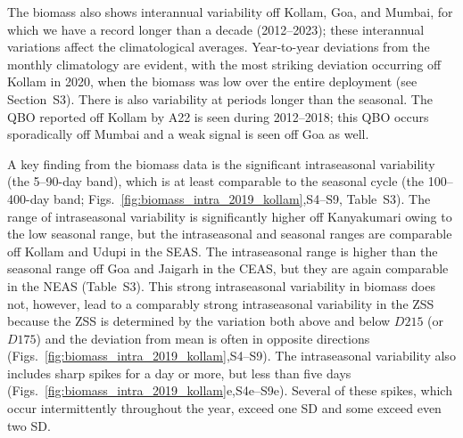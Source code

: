 \documentclass[authoryear,review,11pt]{elsarticle}
\begin{document}
The biomass also shows interannual variability off Kollam, Goa, and Mumbai, for which we have a record longer than a decade (2012--2023); these interannual variations affect the climatological averages. Year-to-year deviations from the monthly climatology are evident, with the most striking deviation occurring off Kollam in 2020, when the biomass was low over the entire deployment (see Section~S3). There is also variability at periods longer than the seasonal. The QBO reported off Kollam by A22 is seen during 2012--2018; this QBO occurs sporadically off Mumbai and a weak signal is seen off Goa as well. 

A key finding from the biomass data is the significant intraseasonal variability (the 5--90-day band), which is at least comparable to the seasonal cycle (the 100--400-day band; Figs.~\ref{fig:biomass_intra_2019_kollam},S4--S9, Table~S3). The range of intraseasonal variability is significantly higher off Kanyakumari owing to the low seasonal range, but the intraseasonal and seasonal ranges are comparable off Kollam and Udupi in the SEAS.  The intraseasonal range is higher than the seasonal range off Goa and Jaigarh in the CEAS, but they are again comparable in the NEAS (Table~S3). This strong intraseasonal variability in biomass does not, however, lead to a comparably strong intraseasonal variability in the ZSS because the ZSS is determined by the variation both above and below $D215$ (or $D175$) and the deviation from mean is often in opposite directions (Figs.~\ref{fig:biomass_intra_2019_kollam},S4--S9). The intraseasonal variability also includes sharp spikes for a day or more, but less than five days (Figs.~\ref{fig:biomass_intra_2019_kollam}e,S4e--S9e).  Several of these spikes, which occur intermittently throughout the year, exceed one SD and some exceed even two SD.

 

\end{document}
